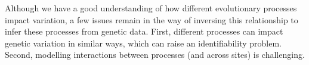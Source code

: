 %
Although we have a good understanding of how different evolutionary processes impact variation,
a few issues remain in the way of inversing this relationship to infer these processes from genetic data.
First, different processes can impact genetic variation in similar ways, which can raise an identifiability problem.
Second, modelling interactions between processes (and across sites) is challenging.











